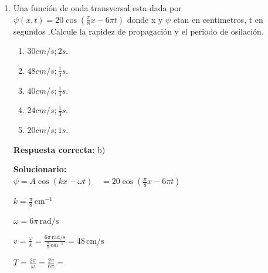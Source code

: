 \begin{enumerate}
	\vspace{2mm}
	\textbf{Solucionario:}\\
	$P = \frac{h}{\lambda} = \frac{hf}{c}$
	
	$P = \frac{(6,63 \times 10^{-34} \, \text{J}\cdot\text{s})(6 \times 10^{15} \, \text{Hz})}{3 \times 10^8 \, \text{m/s}}$
	
	$P = 6,63 \times 10^{-34} \times 2 \times 10^{15} \times 10^{-8}$
	
	\vspace{6mm}
	
	\item Una función de onda transversal esta dada por $\psi(x,t)=20\cos(\frac{\pi}{8}x-6\pi t)$ donde x y $\psi$ etan en centimetros, t en segundos .Calcule la rapidez de propagación y el periodo de osilación.
	\begin{enumerate}[label=\alph*)]
		\item $30 cm/s ; 2s.$
		\item $48 cm/s ; \frac{1}{3}s.$
		\item $40 cm/s ; \frac{1}{4}s.$
		\item $24 cm/s ; \frac{1}{3}s.$
		\item $20 cm/s ; 1s.$
	\end{enumerate}
	\textbf{Respuesta correcta:} b)
	
	\vspace{2mm}
	\textbf{Solucionario:}\\
		$\psi = A \cos(kx - \omega t)$
		$\phantom{\psi} = 20 \cos\left(\frac{\pi}{8}x - 6\pi t\right)$
		
		
		$k = \frac{\pi}{8} \, \text{cm}^{-1}$
		
		$\omega = 6\pi \, \text{rad/s}$
		
		$v = \frac{\omega}{k} = \frac{6\pi \, \text{rad/s}}{\frac{\pi}{8} \, \text{cm}^{-1}} = 48 \, \text{cm/s}$
		
		$T = \frac{2\pi}{\omega} = \frac{2\pi}{6\pi} =$ 
	
	\vspace{6mm}	
	
	
	
	
	
	
	
	
	
	
	
	
	
\end{enumerate}


